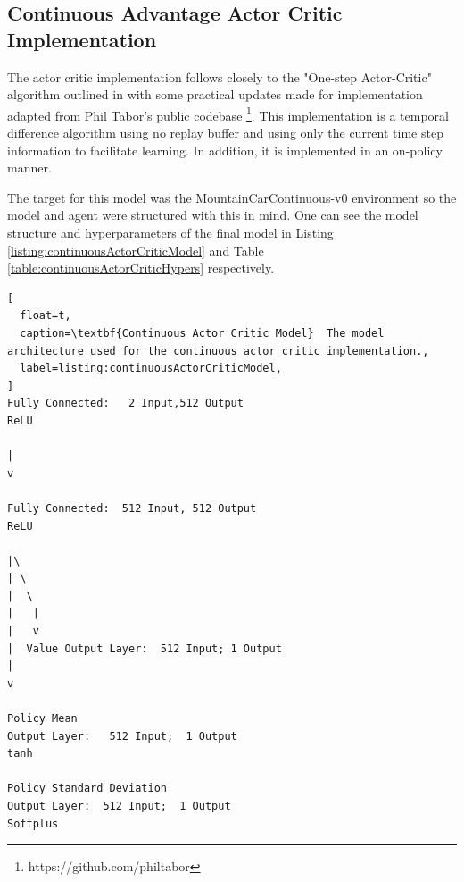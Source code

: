 \documentclass[conference]{IEEEtran}
\begin{document}
\subsection{Continuous Advantage Actor Critic Implementation}
The actor critic implementation follows closely to the "One-step Actor-Critic" algorithm outlined in \cite{ReinforcementLearningBook} with some practical updates made for implementation adapted from Phil Tabor's public codebase \footnote{https://github.com/philtabor}.
This implementation is a temporal difference algorithm using no replay buffer and using only the current time step information to facilitate learning.
In addition, it is implemented in an on-policy manner.

The target for this model was the MountainCarContinuous-v0 environment so the model and agent were structured with this in mind.
One can see the model structure and hyperparameters of the final model in Listing \ref{listing:continuousActorCriticModel} and Table \ref{table:continuousActorCriticHypers} respectively.


\begin{lstlisting}[
  float=t,
  caption=\textbf{Continuous Actor Critic Model}  The model architecture used for the continuous actor critic implementation.,
  label=listing:continuousActorCriticModel,
]
Fully Connected:   2 Input,512 Output
ReLU

|
v

Fully Connected:  512 Input, 512 Output  
ReLU

|\
| \
|  \
|   |
|   v
|  Value Output Layer:  512 Input; 1 Output
|
v

Policy Mean 
Output Layer:   512 Input;  1 Output
tanh

Policy Standard Deviation 
Output Layer:  512 Input;  1 Output
Softplus
\end{lstlisting}
\end{document}

